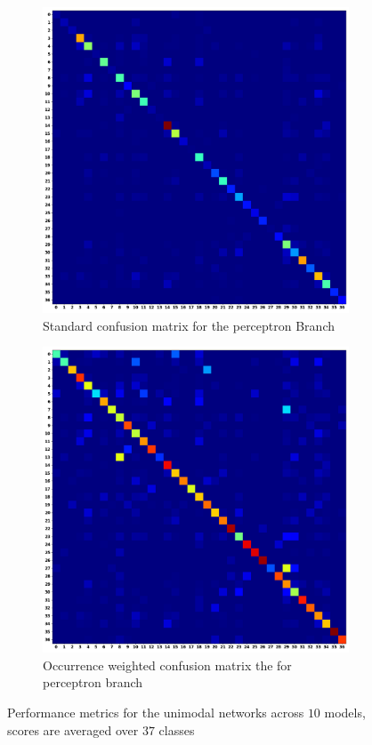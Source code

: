 \documentclass[12pt,letterpaper]{article}
\begin{document}
\begin{figure}[H]
	\begin{subfigure}[b]{0.45\textwidth}
	\centering
	\includegraphics[scale=0.18]{../FiguresMetrics/XValBetaMLP_Avg_Standard_Confusion}
	\caption{Standard confusion matrix for the perceptron Branch}
	\end{subfigure}
	\hfill
	\begin{subfigure}[b]{0.45\textwidth}
	\centering
	\includegraphics[scale=0.18]{../FiguresMetrics/XValBetaMLP_Avg_Hits_Weighted_Confusion}
	\caption{Occurrence weighted confusion matrix the for perceptron branch}
	\end{subfigure}	
	\caption{Performance metrics for the unimodal networks across $10$ models, scores are averaged over $37$ classes}
	\label{fig-UnimodalConfs}
\end{figure}
\end{document}
